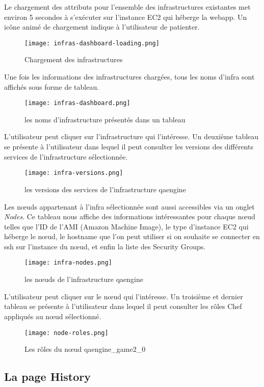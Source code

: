 Le chargement des attributs pour l'ensemble des infrastructures existantes met
environ 5 secondes à s'exécuter sur l'instance EC2 qui héberge la webapp.
Un icône animé de chargement indique à l'utilisateur de patienter.

\begin{figure}[H]
  \texttt{[image: infras-dashboard-loading.png]}  
  \caption{Chargement des infrastructures}
\end{figure}

Une fois les informations des infrastructures chargées, tous les noms d'infra
sont affichés sous forme de tableau.
\begin{figure}[H]
  \texttt{[image: infras-dashboard.png]}  
  \caption{les noms d'infrastructure présentés dans un tableau}
\end{figure}

L'utilisateur peut cliquer sur l'infrastructure qui l'intéresse.
Un deuxième tableau se présente à l'utilisateur dans lequel il peut consulter
les versions des différents services de l'infrastructure sélectionnée.
\begin{figure}[H]
  \texttt{[image: infra-versions.png]}  
  \caption{les versions des services de l'infrastructure qaengine}
\end{figure}

Les nœuds appartenant à l'infra sélectionnée sont aussi accessibles via un
onglet \textit{Nodes}. 
Ce tableau nous affiche des informations intéressantes pour chaque nœud telles
que l'ID de l'AMI (Amazon Machine Image), le type d'instance EC2 qui héberge le
nœud, le hostname que l'on peut utiliser si on souhaite se connecter en ssh sur
l'instance du nœud, et enfin la liste des Security Groups.

\begin{figure}[H]
  \texttt{[image: infra-nodes.png]}  
  \caption{les nœuds de l'infrastructure qaengine}
\end{figure}

L'utilisateur peut cliquer sur le nœud qui l'intéresse.
Un troisième et dernier tableau se présente à l'utilisateur dans lequel il peut
consulter les rôles Chef appliqués au nœud sélectionné.

\begin{figure}[H]
  \texttt{[image: node-roles.png]}  
  \caption{Les rôles du nœud qaengine\_game2\_0}
\end{figure}

\subsection{La page History}

